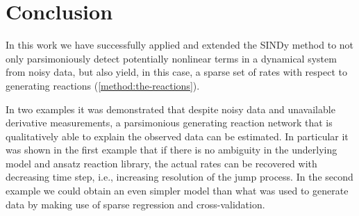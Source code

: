 \documentclass[oneside, abstracton, titlepage]{scrartcl}
\begin{document}
	\section{Conclusion}
	In this work we have successfully applied and extended the SINDy method to not only parsimoniously detect potentially nonlinear terms in a dynamical system from noisy data, but also yield, in this case, a sparse set of rates with respect to generating reactions (\ref{method:the-reactions}).

	In two examples it was demonstrated that despite noisy data and unavailable derivative measurements, a parsimonious generating reaction network that is qualitatively able to explain the observed data can be estimated.
	In particular it was shown in the first example that if there is no ambiguity in the underlying model and ansatz reaction library, the actual rates can be recovered with decreasing time step, i.e., increasing resolution of the jump process.
	In the second example we could obtain an even simpler model than what was used to generate data by making use of sparse regression and cross-validation.

	\newpage
% 	
	
	
\end{document}
